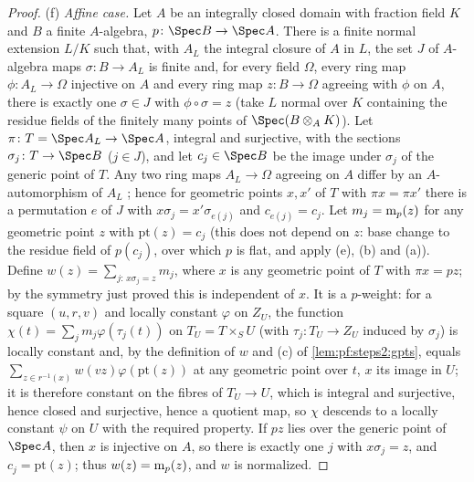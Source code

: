 \begin{proof}
(f) \emph{Affine case.} Let $A$ be an integrally closed domain with fraction field $K$ and $B$ a
finite $A$-algebra, $p\colon\Spec B\to\Spec A$. There is a finite normal extension $L/K$ such that,
with $A_L$ the integral closure of $A$ in $L$, the set $J$ of $A$-algebra maps $\sigma\colon B\to A_L$ is
finite and, for every field $\Omega$, every ring map $\phi\colon A_L\to\Omega$ injective on $A$ and every
ring map $z\colon B\to\Omega$ agreeing with $\phi$ on $A$, there is exactly one $\sigma\in J$ with
$\phi\circ\sigma=z$ (take $L$ normal over $K$ containing the residue fields of the finitely many points
of $\Spec(B\otimes_AK)$). Let $\pi\colon T=\Spec A_L\to\Spec A$, integral and surjective, with the
sections $\sigma_j\colon T\to\Spec B$ ($j\in J$), and let $c_j\in\Spec B$ be the image under $\sigma_j$
of the generic point of $T$. Any two ring maps $A_L\to\Omega$ agreeing on $A$ differ by an
$A$-automorphism of $A_L$ \cite[Ch.~V, \S2, no.~2, Thm.~2]{Bourbaki1985}; hence for geometric points
$x,x'$ of $T$ with $\pi x=\pi x'$ there is a permutation $e$ of $J$ with $x\sigma_j=x'\sigma_{e(j)}$
and $c_{e(j)}=c_j$. Let $m_j=\mathrm{m}_p(z)$ for any geometric point $z$ with $\mathrm{pt}(z)=c_j$ (this
does not depend on $z$: base change to the residue field of $p(c_j)$, over which $p$ is flat, and
apply (e), (b) and (a)). Define $w(z)=\sum_{j:\,x\sigma_j=z}m_j$, where $x$ is any geometric point
of $T$ with $\pi x=p z$; by the symmetry just proved this is independent of $x$. It is a $p$-weight:
for a square $(u,r,v)$ and locally constant $\varphi$ on $Z_U$, the function
$\chi(t)=\sum_jm_j\varphi(\tau_j(t))$ on $T_U=T\times_SU$ (with $\tau_j\colon T_U\to Z_U$ induced by
$\sigma_j$) is locally constant and, by the definition of $w$ and (c) of \cref{lem:pf:steps2:gpts},
equals $\sum_{z\in r^{-1}(x)}w(vz)\varphi(\mathrm{pt}(z))$ at any geometric point over $t$, $x$ its image
in $U$; it is therefore constant on the fibres of $T_U\to U$, which is integral and surjective, hence
closed and surjective, hence a quotient map, so $\chi$ descends to a locally constant $\psi$ on $U$
with the required property. If $p z$ lies over the generic point of $\Spec A$, then $x$ is injective
on $A$, so there is exactly one $j$ with $x\sigma_j=z$, and $c_j=\mathrm{pt}(z)$; thus
$w(z)=\mathrm{m}_p(z)$, and $w$ is normalized.


\end{proof}
